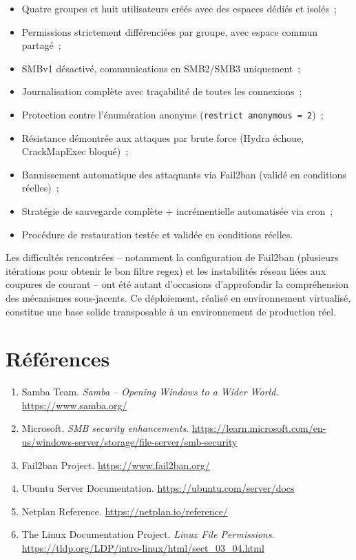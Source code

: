 \documentclass[12pt,a4paper]{article}
\begin{document}
\begin{itemize}[leftmargin=2em]
  \item Quatre groupes et huit utilisateurs créés avec des espaces dédiés et isolés~;
  \item Permissions strictement différenciées par groupe, avec espace commun partagé~;
  \item SMBv1 désactivé, communications en SMB2/SMB3 uniquement~;
  \item Journalisation complète avec traçabilité de toutes les connexions~;
  \item Protection contre l'énumération anonyme (\texttt{restrict anonymous = 2})~;
  \item Résistance démontrée aux attaques par brute force (Hydra échoue, CrackMapExec bloqué)~;
  \item Bannissement automatique des attaquants via Fail2ban (validé en conditions réelles)~;
  \item Stratégie de sauvegarde complète + incrémentielle automatisée via cron~;
  \item Procédure de restauration testée et validée en conditions réelles.
\end{itemize}

Les difficultés rencontrées -- notamment la configuration de Fail2ban (plusieurs itérations
pour obtenir le bon filtre regex) et les instabilités réseau liées aux coupures de courant
-- ont été autant d'occasions d'approfondir la compréhension des mécanismes sous-jacents. Ce déploiement, réalisé en environnement virtualisé, constitue une
base solide transposable à un environnement de production réel.

\section*{Références}

\begin{enumerate}[leftmargin=2em]
  \item Samba Team. \textit{Samba -- Opening Windows to a Wider World}.
    \url{https://www.samba.org/}
  \item Microsoft. \textit{SMB security enhancements}.
    \url{https://learn.microsoft.com/en-us/windows-server/storage/file-server/smb-security}
  \item Fail2ban Project. \url{https://www.fail2ban.org/}
  \item Ubuntu Server Documentation. \url{https://ubuntu.com/server/docs}
  \item Netplan Reference. \url{https://netplan.io/reference/}
  \item The Linux Documentation Project. \textit{Linux File Permissions}.
    \url{https://tldp.org/LDP/intro-linux/html/sect_03_04.html}
\end{enumerate}
\end{document}
